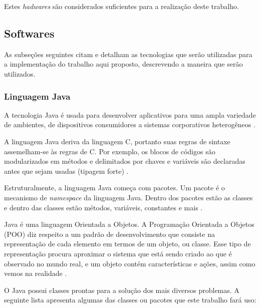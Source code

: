 Estes \textit{hadwares} são considerados suficientes para a realização deste trabalho.

\subsection{Softwares}\label{sub-softw}
As subseções seguintes citam e detalham as tecnologias que serão utilizadas para a implementação do trabalho aqui proposto,  descrevendo a maneira que serão utilizados.

\subsubsection{Linguagem Java}\label{subsec:java}
A tecnologia Java é usada para desenvolver aplicativos para uma ampla variedade de ambientes, de dispositivos consumidores a sistemas corporativos heterogêneos \cite{ibm_java}. 

A linguagem Java deriva da linguagem C, portanto suas regras de sintaxe assemelham-se às regras de C. Por exemplo, os blocos de códigos são modularizados em métodos e delimitados por chaves e variáveis são declaradas antes que sejam usadas (tipagem forte) \cite{ibm_java}. 

Estruturalmente, a linguagem Java começa com pacotes. Um pacote é o mecanismo de \textit{namespace} da linguagem Java. Dentro dos pacotes estão as classes e dentro das classes estão métodos, variáveis, constantes e mais \cite{ibm_java}.

Java é uma linguagem Orientada a Objetos. A Programação Orientada a Objetos (POO) diz respeito a um padrão de desenvolvimento que consiste na representação de cada elemento em termos de um objeto, ou classe. Esse tipo de representação procura aproximar o sistema que está sendo criado ao que é observado no mundo real, e um objeto contém características e ações, assim como vemos na realidade \cite{dev_poo}. 

O Java possui classes prontas para a solução dos mais diversos problemas. A seguinte lista apresenta algumas das classes ou pacotes que este trabalho fará uso:

